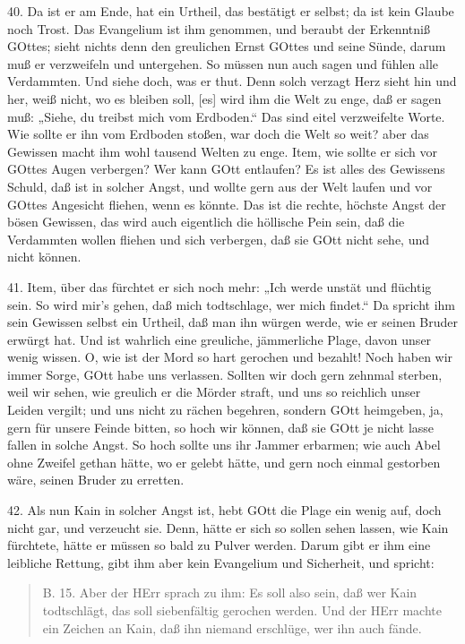 40. Da ist er am Ende, hat ein Urtheil, das bestätigt er selbst; da ist kein Glaube noch Trost. Das Evangelium ist ihm genommen, und beraubt der Erkenntniß GOttes; sieht nichts denn den greulichen Ernst GOttes und seine Sünde, darum muß er verzweifeln und untergehen. So müssen nun auch sagen und fühlen alle Verdammten. Und siehe doch, was er thut. Denn solch verzagt Herz sieht hin und her, weiß nicht, wo es bleiben soll, [es] wird ihm die Welt zu enge, daß er sagen muß: „Siehe, du treibst mich vom Erdboden.“ Das sind eitel verzweifelte Worte. Wie sollte er ihn vom Erdboden stoßen, war doch die Welt so weit? aber das Gewissen macht ihm wohl tausend Welten zu enge. Item, wie sollte er sich vor GOttes Augen verbergen? Wer kann GOtt entlaufen? Es ist alles des Gewissens Schuld, daß ist in solcher Angst, und wollte gern aus der Welt laufen und vor GOttes Angesicht fliehen, wenn es könnte. Das ist die rechte, höchste Angst der bösen Gewissen, das wird auch eigentlich die höllische Pein sein, daß die Verdammten wollen fliehen und sich verbergen, daß sie GOtt nicht sehe, und nicht können.

41. Item, über das fürchtet er sich noch mehr: „Ich werde unstät und flüchtig sein. So wird mir’s gehen, daß mich todtschlage, wer mich findet.“ Da spricht ihm sein Gewissen selbst ein Urtheil, daß man ihn würgen werde, wie er seinen Bruder erwürgt hat. Und ist wahrlich eine greuliche, jämmerliche Plage, davon unser wenig wissen. O, wie ist der Mord so hart gerochen und bezahlt! Noch haben wir immer Sorge, GOtt habe uns verlassen. Sollten wir doch gern zehnmal sterben, weil wir sehen, wie greulich er die Mörder straft, und uns so reichlich unser Leiden vergilt; und uns nicht zu rächen begehren, sondern GOtt heimgeben, ja, gern für unsere Feinde bitten, so hoch wir können, daß sie GOtt je nicht lasse fallen in solche Angst. So hoch sollte uns ihr Jammer erbarmen; wie auch Abel ohne Zweifel gethan hätte, wo er gelebt hätte, und gern noch einmal gestorben wäre, seinen Bruder zu erretten.

42. Als nun Kain in solcher Angst ist, hebt GOtt die Plage ein wenig auf, doch nicht gar, und verzeucht sie. Denn, hätte er sich so sollen sehen lassen, wie Kain fürchtete, hätte er müssen so bald zu Pulver werden. Darum gibt er ihm eine leibliche Rettung, gibt ihm aber kein Evangelium und Sicherheit, und spricht:

\begin{quote}
B. 15. Aber der HErr sprach zu ihm: Es soll also sein, daß wer Kain todtschlägt, das soll siebenfältig gerochen werden. Und der HErr machte ein Zeichen an Kain, daß ihn niemand erschlüge, wer ihn auch fände.
\end{quote}

